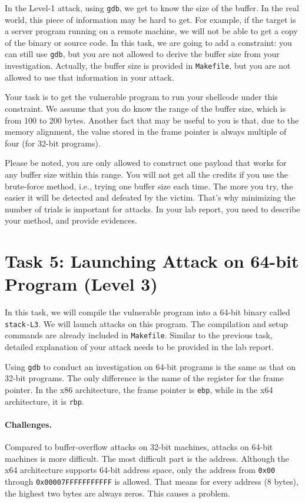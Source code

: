 In the Level-1 attack, using \texttt{gdb}, we get to know 
the size of the buffer. In the real world, this piece of information
may be hard to get. For example, if the target is a server program
running on a remote machine, we will not be able to get a copy
of the binary or source code. In this task, we are going to add a 
constraint: you can still use \texttt{gdb}, but you are not allowed
to derive the buffer size from your investigation. Actually, the 
buffer size is provided in \texttt{Makefile}, but you are not allowed
to use that information in your attack.

Your task is to get the vulnerable program to run your shellcode 
under this constraint. We assume that you do know the range of the 
buffer size, which is from 100 to 200 bytes. Another fact that 
may be useful to you is that, due to the memory alignment,
the value stored in the 
frame pointer is always multiple of four (for 32-bit programs). 

Please be noted, you are only allowed
to construct one payload that works for any buffer size
within this range.  You will not get all the credits if you
use the brute-force method, i.e., trying one buffer size
each time. The more you try, the easier it will be detected
and defeated by the victim. That's why minimizing the number
of trials is important for attacks.
In your lab report, you need to describe your method,
and provide evidences. 



\section{Task 5: Launching Attack on 64-bit Program (Level 3)}

In this task, we will compile the vulnerable program 
into a 64-bit binary called \texttt{stack-L3}.  
We will launch attacks on this program. The compilation and setup
commands are already included in \texttt{Makefile}. Similar to
the previous task, detailed explanation of your attack needs to be provided 
in the lab report. 


Using \texttt{gdb} to conduct an investigation on 64-bit programs 
is the same as that on 32-bit programs.
The only difference is the name of the register for the frame pointer.
In the x86 architecture,
the frame pointer is \texttt{ebp}, while in the x64 architecture,
it is \texttt{rbp}. 


\paragraph{Challenges.} Compared to buffer-overflow attacks on 32-bit
machines, attacks on 64-bit machines is more difficult. The most
difficult part is the address. Although the x64 architecture
supports 64-bit address space, only the address from
\texttt{0x00} through \texttt{0x00007FFFFFFFFFFF} is allowed. That means for
every address (8 bytes), the highest two bytes are always zeros.
This causes a problem.


